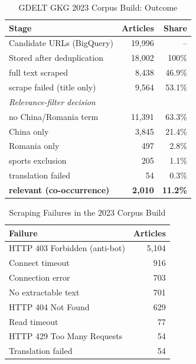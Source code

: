 \documentclass[conference]{IEEEtran}
\begin{document}
\begin{table}[htbp]
\caption{GDELT GKG 2023 Corpus Build: Outcome}
\label{tab:bq-outcome}
\centering
\small
\begin{tabular}{lrr}
\toprule
\textbf{Stage} & \textbf{Articles} & \textbf{Share} \\
\midrule
Candidate URLs (BigQuery) & 19,996 & -- \\
Stored after deduplication & 18,002 & 100\% \\
\quad full text scraped & 8,438 & 46.9\% \\
\quad scrape failed (title only) & 9,564 & 53.1\% \\
\midrule
\multicolumn{3}{l}{\textit{Relevance-filter decision}} \\
\quad no China/Romania term & 11,391 & 63.3\% \\
\quad China only & 3,845 & 21.4\% \\
\quad Romania only & 497 & 2.8\% \\
\quad sports exclusion & 205 & 1.1\% \\
\quad translation failed & 54 & 0.3\% \\
\quad \textbf{relevant (co-occurrence)} & \textbf{2,010} & \textbf{11.2\%} \\
\bottomrule
\end{tabular}
\end{table}

\begin{table}[htbp]
\caption{Scraping Failures in the 2023 Corpus Build}
\label{tab:bq-scrape}
\centering
\small
\begin{tabular}{lr}
\toprule
\textbf{Failure} & \textbf{Articles} \\
\midrule
HTTP 403 Forbidden (anti-bot) & 5,104 \\
Connect timeout & 916 \\
Connection error & 703 \\
No extractable text & 701 \\
HTTP 404 Not Found & 629 \\
Read timeout & 77 \\
HTTP 429 Too Many Requests & 54 \\
Translation failed & 54 \\
\bottomrule
\end{tabular}
\end{table}
\end{document}
